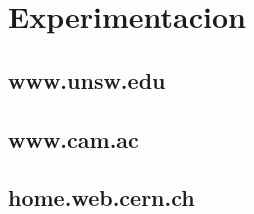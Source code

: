 \section{Experimentacion}
\subsection{www.unsw.edu}
\subsection{www.cam.ac}
\subsection{home.web.cern.ch}
